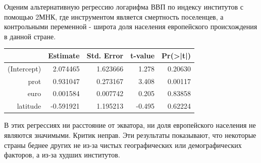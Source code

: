 \documentclass[a4paper,12pt]{article} %
\begin{document}
Оценим альтернативную регрессию логарифма ВВП по индексу институтов с помощью 2МНК, где инструментом является смертность  поселенцев, а контрольными переменной - широта доля населения европейского происхождения в данной
стране.

\newpage

\begin{table}[h!]
	\centering
	\begin{tabular}{rrrrr}
		\hline
		& Estimate & Std. Error & t-value & Pr(>|t|) \\ 
		\hline
		(Intercept) &  2.074465  &  1.623666 &  1.278 & 0.20630  \\ 
		prot &  0.931047 &  0.273167 &  3.408 & 0.00117 \\ 
		euro      &   0.001584 &  0.007742  & 0.205 & 0.83858   \\ 
		latitude &  -0.591921  &  1.195213 & -0.495 &  0.62224       
		\\ 
		\hline
	\end{tabular}
\end{table}	


В этих регрессиях ни расстояние от экватора, ни доля европейского населения не являются значимыми. Критик неправ. Эти результаты показывают, что некоторые страны  беднее других не из-за чистых географических или демографических  факторов, а из-за худших институтов.


	
\end{document}
